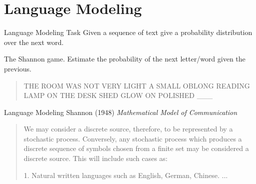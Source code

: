 \documentclass{beamer}
\begin{document}
\section{Language Modeling}

\begin{frame}{Language Modeling Task}
  Given a sequence of text give a probability distribution 
  over the next word. 

\air

  The Shannon game. Estimate the probability of the next letter/word
  given the previous.

  \begin{quote}
    THE ROOM WAS NOT VERY LIGHT A SMALL OBLONG READING LAMP ON THE
    DESK SHED GLOW ON POLISHED \_\_\_\
  \end{quote}


\end{frame}


\begin{frame}{Language Modeling}
  Shannon (1948) \textit{Mathematical Model of Communication} 

\air
  
\begin{quote}  
  We may consider a discrete source, therefore,
to be represented by a stochastic process. Conversely, any stochastic
process which produces a discrete sequence of symbols chosen from a finite
set may be considered a discrete source. This will include such cases as:

1. Natural written languages such as English, German, Chinese.
...
\end{quote}
\end{frame}
\end{document}
